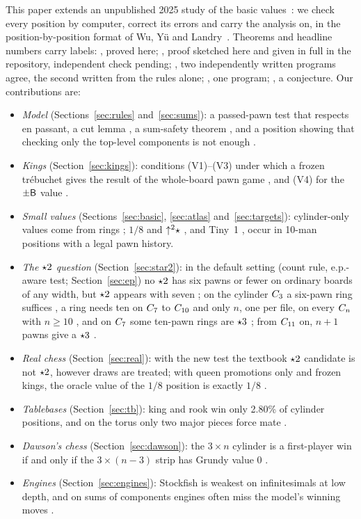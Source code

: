 This paper extends an unpublished 2025 study of the basic values\bytheauthor~\cite{Study2025}: we check
every position by computer, correct its errors and carry the analysis on, in the position-by-position format
of Wu, Y\"u and Landry~\cite{WuYuLandry2010}. Theorems and headline numbers
carry labels: , proved here; , proof sketched here and given in full in the
repository, independent check pending; , two independently written programs agree,
the second written from the rules alone; , one program; , a conjecture. Our contributions
are:
\begin{itemize}
\item \emph{Model} (Sections~\ref{sec:rules} and~\ref{sec:sums}): a passed-pawn test that respects en passant,
  a cut lemma , a sum-safety theorem , and a position showing that checking only the
  top-level components is not enough .
\item \emph{Kings} (Section~\ref{sec:kings}): conditions (V1)--(V3) under which a frozen tr\'ebuchet gives the
  result of the whole-board pawn game , and (V4) for the $\pm\mathsf{B}$ value .
\item \emph{Small values} (Sections~\ref{sec:basic}, \ref{sec:atlas} and~\ref{sec:targets}): cylinder-only values
  come from rings ; $1/8$ and $\mathord{\uparrow^{2}}\star$ , and Tiny~1 , occur in 10-man positions
  with a legal pawn history.
\item \emph{The $\mathord{\star2}$ question} (Section~\ref{sec:star2}): in the default setting (count rule, e.p.-aware
  test; Section~\ref{sec:ep}) no $\mathord{\star2}$ has six
  pawns or fewer on ordinary boards of any width, but $\mathord{\star2}$ appears with seven
  ; on the cylinder $C_{3}$ a six-pawn ring suffices , a ring needs ten on $C_{7}$ to $C_{10}$
   and only $n$, one per file, on every $C_{n}$ with $n\ge10$ , and on $C_{7}$ some ten-pawn
  rings are $\mathord{\star3}$ ; from $C_{11}$ on, $n+1$ pawns give a $\mathord{\star3}$ .
\item \emph{Real chess} (Section~\ref{sec:real}): with the new test the textbook $\mathord{\star2}$ candidate is not
  $\mathord{\star2}$, however draws are treated; with queen promotions only and frozen kings, the oracle value of the $1/8$ position
  is exactly $1/8$ .
\item \emph{Tablebases} (Section~\ref{sec:tb}): king and rook win only 2.80\% of cylinder positions, and on the
  torus only two major pieces force mate .
\item \emph{Dawson's chess} (Section~\ref{sec:dawson}): the $3\times n$ cylinder is a first-player win if and
  only if the $3\times(n-3)$ strip has Grundy value $0$ .
\item \emph{Engines} (Section~\ref{sec:engines}): Stockfish is weakest on infinitesimals at low depth, and on sums
  of components engines often miss the model's winning moves .
\end{itemize}

